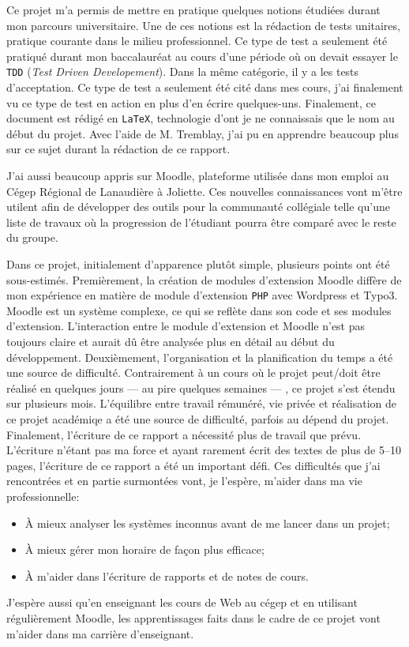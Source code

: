 \begin{conclusion}
Ce projet m'a permis de mettre en pratique quelques notions \'etudi\'ees durant mon parcours universitaire.
Une de ces notions est la r\'edaction de tests unitaires, pratique courante dans le milieu professionnel.
Ce type de test a seulement \'et\'e pratiqu\'e durant mon baccalaur\'eat au cours d'une p\'eriode o\`u on devait essayer le \texttt{TDD} (\textit{Test Driven Developement}).
Dans la m\^eme cat\'egorie, il y a les tests d'acceptation.
Ce type de test a seulement \'et\'e cit\'e dans mes cours, j'ai finalement vu ce type de test en action en plus d'en \'ecrire quelques-uns.
Finalement, ce document est r\'edig\'e en \texttt{LaTeX}, technologie d'ont je ne connaissais que le nom au d\'ebut du projet.
Avec l'aide de M. Tremblay, j'ai pu en apprendre beaucoup plus sur ce sujet durant la r\'edaction de ce rapport.

J'ai aussi beaucoup appris sur Moodle, plateforme utilis\'ee dans mon emploi au C\'egep R\'egional de Lanaudi\`ere \`a Joliette.
Ces nouvelles connaissances vont m'\^etre utilent afin de d\'evelopper des outils pour la communaut\'e coll\'egiale telle qu'une liste de travaux o\`u la progression de l'\'etudiant pourra \^etre compar\'e avec le reste du groupe.

Dans ce projet, initialement d'apparence plut\^ot simple, plusieurs points ont \'et\'e sous-estim\'es.
Premi\`erement, la cr\'eation de modules d'extension Moodle diff\`ere de mon exp\'erience en mati\`ere de module d'extension \texttt{PHP} avec Wordpress et Typo3.
Moodle est un syst\`eme complexe, ce qui se refl\`ete dans son code et ses modules d'extension.
L'interaction entre le module d'extension et Moodle n'est pas toujours claire et aurait d\^u \^etre analys\'ee plus en d\'etail au d\'ebut du d\'eveloppement.
Deuxi\`emement, l'organisation et la planification du temps a \'et\'e une source de difficult\'e.
Contrairement \`a un cours o\`u le projet peut/doit \^etre r\'ealis\'e en quelques jours --- au pire quelques semaines --- , ce projet s'est \'etendu sur plusieurs mois.
L'\'equilibre entre travail r\'emun\'er\'e,  vie priv\'ee et r\'ealisation de ce projet acad\'emiqe a \'et\'e une source de difficult\'e, parfois au d\'epend du projet.
Finalement, l'\'ecriture de ce rapport a n\'ecessit\'e plus de travail que pr\'evu.
L'\'ecriture n'\'etant pas ma force et ayant rarement \'ecrit des textes de plus de 5--10 pages, l'\'ecriture de ce rapport a \'et\'e un important d\'efi.
Ces difficult\'es que j'ai rencontr\'ees et en partie surmont\'ees vont, je l'esp\`ere, m'aider dans ma vie professionnelle:
\begin{itemize}
  \item \`A mieux analyser les syst\`emes inconnus avant de me lancer dans un projet;
  \item \`A mieux g\'erer mon horaire de fa\c{c}on plus efficace;
  \item \`A m'aider dans l'\'ecriture de rapports et de notes de cours.
\end{itemize}
J'esp\`ere aussi qu'en enseignant les cours de Web au c\'egep et en utilisant r\'eguli\`erement Moodle, les apprentissages faits dans le cadre de ce projet vont m'aider dans ma carri\`ere d'enseignant.
\end{conclusion}